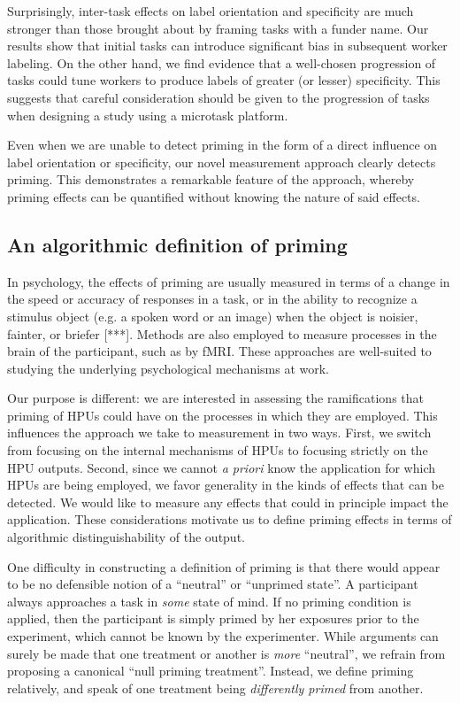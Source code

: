 \documentclass[a4paper]{report}
\begin{document}
Surprisingly, inter-task effects on label orientation and specificity are 
much stronger than those brought about by framing tasks with a funder name. 
Our results 
show that initial tasks can introduce significant bias in subsequent worker 
labeling.  On the other hand, we find evidence that a well-chosen progression 
of tasks could tune workers to produce labels of greater (or lesser) 
specificity.  This suggests that careful consideration should be given to
the progression of tasks when designing a study using a microtask platform.

Even when we are unable to detect priming in the form of a direct
influence on label orientation or specificity, our novel measurement approach 
clearly detects priming. This demonstrates a remarkable feature of the 
approach, whereby priming effects can be quantified without knowing the nature 
of said effects. 

\subsection*{An algorithmic definition of priming}

In psychology, the effects of priming are usually measured in terms of a 
change in the  
speed or accuracy of responses in a task, or in the ability to recognize a 
stimulus object (e.g. a spoken word or an image) when the object is noisier, 
fainter, or briefer [***].  Methods are also employed to measure processes
in the brain of the participant, such as by fMRI.  These approaches are 
well-suited to studying the underlying psychological mechanisms at work.

Our purpose is different: we are interested in assessing the ramifications
that priming of HPUs could have on the processes in which they are employed.
This influences the approach we take to measurement in two ways.  First, we 
switch from focusing on the internal mechanisms of HPUs to focusing strictly 
on the HPU outputs.  Second, since we cannot \textit{a priori} know the 
application for which HPUs are being employed, we favor generality in the 
kinds of effects that can be detected.  We would like to measure any effects
that could in principle impact the application.  These considerations motivate
us to define priming effects in terms of algorithmic distinguishability of 
the output.

One difficulty in constructing a definition of priming is that there would 
appear to be no defensible notion of a ``neutral'' or ``unprimed state''.  A 
participant 
always approaches a task in \textit{some} state of mind.  If no priming 
condition is applied, then the participant is simply primed by her
exposures prior to the experiment, which cannot be known by the experimenter.  
While arguments can surely be made that one treatment or another is 
\textit{more} 
``neutral'', we refrain from proposing a canonical ``null priming treatment''. 
Instead, we define priming relatively, and speak of one treatment being 
\textit{differently primed} from another.
\end{document}
